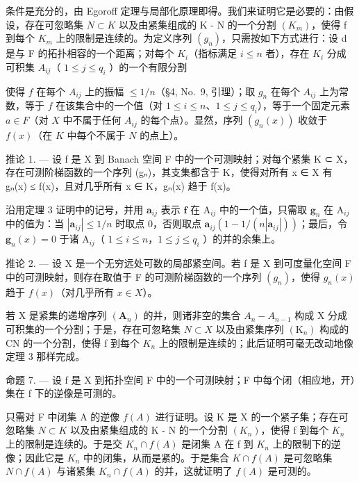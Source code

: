 条件是充分的，由 Egoroff 定理与局部化原理即得。我们来证明它是必要的：由假设，存在可忽略集 \(N \subset K\) 以及由紧集组成的 K - N 的一个分割 \((K_{m})\)，使得 f 到每个 \(K_{m}\) 上的限制是连续的。为定义序列 \((g_{n})\)，只需按如下方式进行：设 d 是与 F 的拓扑相容的一个距离；对每个 \(K_{i}\)（指标满足 \(i \leqslant n\) 者），存在 \(K_{i}\) 分成可积集 \(A_{ij}\)（ \(1 \leqslant j \leqslant q_{i}\) ）的一个有限分割

使得 \(f\) 在每个 \(A_{ij}\) 上的振幅 \(\leqslant 1/n\)（§4, No.~9, 引理）；取 \(g_n\) 在每个 \(A_{ij}\) 上为常数，等于 \(f\) 在该集合中的一个值（对 \(1 \leqslant i \leqslant n\)、\(1 \leqslant j \leqslant q_i\)），等于一个固定元素 \(a \in F\)（对 \(X\) 中不属于任何 \(A_{ij}\) 的每个点）。显然，序列 \((g_n(x))\) 收敛于 \(f(x)\)（在 \(K\) 中每个不属于 \(N\) 的点上）。

推论 1. --- 设 f 是 X 到 Banach 空间 F 中的一个可测映射；对每个紧集 K ⊂ X，存在可测阶梯函数的一个序列 (gₙ)，其支集都含于 K，使得对所有 x ∈ X 有 \textbar gₙ(x)\textbar{} ≤ \textbar f(x)\textbar{}，且对几乎所有 x ∈ K，gₙ(x) 趋于 f(x)。

沿用定理 3 证明中的记号，并用 \(\mathbf{a}_{ij}\) 表示 \(\mathbf{f}\) 在 \(\mathrm{A}_{ij}\) 中的一个值，只需取 \(\mathbf{g}_n\) 在 \(\mathrm{A}_{ij}\) 中的值为：当 \(|\mathbf{a}_{ij}| \leqslant 1/n\) 时取点 0，否则取点 \(\mathbf{a}_{ij}(1 - 1/(n|\mathbf{a}_{ij}|))\)；最后，令 \(\mathbf{g}_n(x) = 0\) 于诸 \(\mathrm{A}_{ij}\)（ \(1 \leqslant i \leqslant n\)，\(1 \leqslant j \leqslant q_i\) ）的并的余集上。

推论 2. --- 设 X 是一个无穷远处可数的局部紧空间。若 f 是 X 到可度量化空间 F 中的可测映射，则存在取值于 F 的可测阶梯函数的一个序列 \((g_{n})\)，使得 \(g_{n}(x)\) 趋于 \(f(x)\)（对几乎所有 \(x \in X\)）。

若 X 是紧集的递增序列 \((\mathbf{A}_{n})\) 的并，则诸非空的集合 \(A_{n}-A_{n-1}\) 构成 X 分成可积集的一个分割；于是，存在可忽略集 \(N\subset X\) 以及由紧集序列 \((\mathrm{K}_{n})\) 构成的 CN 的一个分割，使得 f 到每个 \(K_{n}\) 上的限制是连续的；此后证明可毫无改动地像定理 3 那样完成。

命题 7. --- 设 f 是 X 到拓扑空间 F 中的一个可测映射；F 中每个闭（相应地，开）集在 f 下的逆像是可测的。

只需对 F 中闭集 A 的逆像 \(f(A)\) 进行证明。设 K 是 X 的一个紧子集；存在可忽略集 \(N \subset K\) 以及由紧集组成的 K - N 的一个分割 \((K_n)\)，使得 f 到每个 \(K_n\) 上的限制是连续的。于是交 \(K_n \cap f(A)\) 是闭集 A 在 f 到 \(K_n\) 上的限制下的逆像；因此它是 \(K_n\) 中的闭集，从而是紧的。于是集合 \(K \cap f(A)\) 是可忽略集 \(N \cap f(A)\) 与诸紧集 \(K_n \cap f(A)\) 的并，这就证明了 \(f(A)\) 是可测的。

